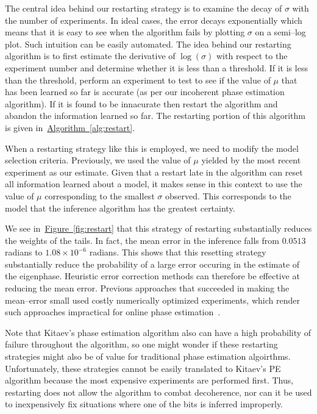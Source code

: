 \documentclass[aps,pra,amsmath,twocolumn,amssymb,superscriptaddress]{revtex4-1}
\newcommand{\fig}[1]{\hyperref[fig:#1]{Figure~\ref*{fig:#1}}}
\newcommand{\alg}[1]{\hyperref[alg:#1]{Algorithm~\ref*{alg:#1}}}
\begin{document}
{The central idea behind our restarting strategy is to examine the decay of $\sigma$ with the number of experiments.  In ideal cases, the error decays exponentially which means that it is easy to see when the algorithm fails by plotting $\sigma$ on a semi--log plot.  Such intuition can be easily automated.  The idea behind our restarting algorithm is to first estimate the derivative of $\log(\sigma)$ with respect to the experiment number and determine whether it is less than a threshold.  If it is less than the threshold, perform an experiment to test to see if the value of $\mu$ that has been learned so far is accurate (as per our incoherent phase estimation algorithm).  If it is found to be innacurate then restart the algorithm and abandon the information learned so far.  The restarting portion of this algorithm is given in~\alg{restart}.

When a restarting strategy like this is employed, we need to modify the model selection criteria.  Previously, we used the value of $\mu$ yielded by the most recent experiment as our estimate.   Given that a restart late in the algorithm can reset all information learned about a model, it makes sense in this context to use the value of $\mu$ corresponding to the smallest $\sigma$ observed.  This corresponds to the model that the inference algorithm has the greatest certainty.

We see in~\fig{restart} that this strategy of restarting substantially reduces the weights of the tails.  In fact, the mean error in the inference falls from $0.0513$ radians to $1.08\times 10^{-6}$ radians.  This shows that this resetting strategy substantially reduce the probability of a large error occuring in the estimate of the eigenphase.  Heuristic error correction methods can therefore be effective at reducing the mean error.  Previous approaches that succeeded in making the mean--error small used costly numerically optimized experiments, which render such approaches impractical for online phase estimation~\cite{granade_robust_2012,ferrie_how_2013, wiebe_hamiltonian_2014,wiebe_quantum_2014-1,WGC15}.

Note that Kitaev's phase estimation algorithm also can have a high probability of failure throughout the algorithm, so one might wonder if these restarting strategies might also be of value for traditional phase estimation algoirthms.  Unfortunately, these strategies cannot be easily translated to Kitaev's PE algorithm because the most expensive experiments are performed first.  Thus, restarting does not allow the algorithm to combat decoherence, nor can it be used to inexpensively fix situations where one of the bits is inferred improperly.

}
\end{document}
